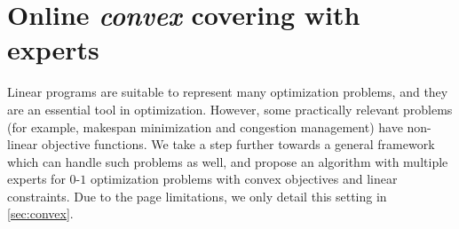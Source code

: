 \section{Online \emph{convex} covering with experts}

Linear programs are suitable to represent many optimization problems, and they are an essential tool in optimization. However, some practically relevant problems (for example, makespan minimization and congestion management) have non-linear objective functions. We take a step further towards a general framework which can handle such problems as well, and propose an algorithm with multiple experts for $0$-$1$ optimization problems with convex objectives and linear constraints. Due to the page limitations, we only detail this setting in \cref{sec:convex}.
